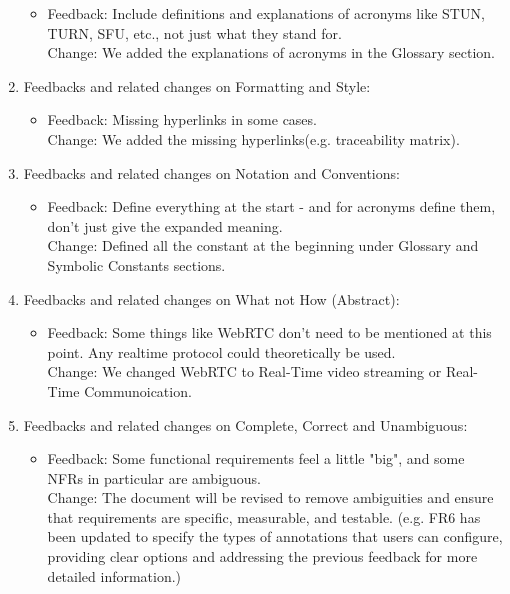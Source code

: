 \documentclass{article}
\begin{document}
\begin{enumerate}
\begin{itemize}
        \item Feedback: Include definitions and explanations of acronyms like STUN, TURN, SFU, etc., not just what they stand for.\\
                Change: We added the explanations of acronyms in the Glossary section.
    \end{itemize}
    \item Feedbacks and related changes on Formatting and Style:
    \begin{itemize}
        \item Feedback: Missing hyperlinks in some cases.\\
                Change: We added the missing hyperlinks(e.g. traceability matrix).
    \end{itemize}
    \item Feedbacks and related changes on Notation and Conventions:
    \begin{itemize}
        \item Feedback: Define everything at the start - and for acronyms define them, don't just give the expanded meaning.\\
                Change: Defined all the constant at the beginning under Glossary and Symbolic Constants sections.
    \end{itemize}
    \item Feedbacks and related changes on What not How (Abstract):
    \begin{itemize}
        \item Feedback: Some things like WebRTC don't need to be mentioned at this point. Any realtime protocol could theoretically be used.\\
                Change: We changed WebRTC to Real-Time video streaming or Real-Time Communoication.
    \end{itemize}
    \item Feedbacks and related changes on Complete, Correct and Unambiguous:
    \begin{itemize}
        \item Feedback: Some functional requirements feel a little "big", and some NFRs in particular are ambiguous.\\
                Change: The document will be revised to remove ambiguities and ensure that requirements are specific, measurable, and testable.
                (e.g. FR6 has been updated to specify the types of annotations that users can configure, providing clear options and addressing the previous feedback for more detailed information.)

\end{itemize}
\end{enumerate}
\end{document}
